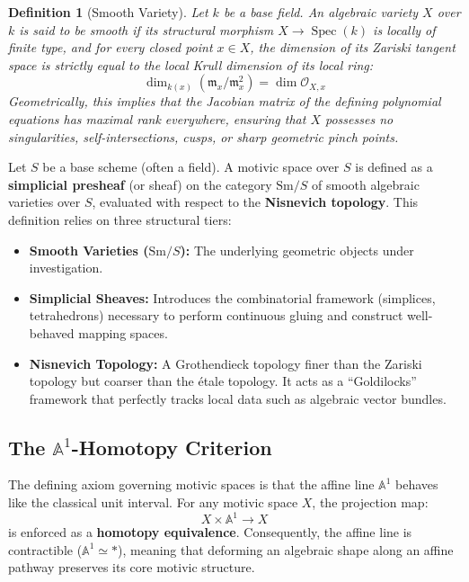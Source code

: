 \documentclass[11pt,oneside]{article}
\newtheorem{definition}{Definition}[section]
\DeclareMathOperator{\Spec}{Spec}
\begin{document}
\begin{definition}[Smooth Variety]
Let $k$ be a base field. An algebraic variety $X$ over $k$ is said to be \emph{smooth} if its structural morphism $X \to \Spec(k)$ is locally of finite type, and for every closed point $x \in X$, the dimension of its Zariski tangent space is strictly equal to the local Krull dimension of its local ring:
\[ \dim_{k(x)} (\mathfrak{m}_x / \mathfrak{m}_x^2) = \dim \mathcal{O}_{X,x} \]
Geometrically, this implies that the Jacobian matrix of the defining polynomial equations has maximal rank everywhere, ensuring that $X$ possesses no singularities, self-intersections, cusps, or sharp geometric pinch points.
\end{definition}

Let $S$ be a base scheme (often a field). A motivic space over $S$ is defined as a \textbf{simplicial presheaf} (or sheaf) on the category $\text{Sm}/S$ of smooth algebraic varieties over $S$, evaluated with respect to the \textbf{Nisnevich topology}. This definition relies on three structural tiers:
\begin{itemize}
    \item \textbf{Smooth Varieties ($\text{Sm}/S$):} The underlying geometric objects under investigation.
    \item \textbf{Simplicial Sheaves:} Introduces the combinatorial framework (simplices, tetrahedrons) necessary to perform continuous gluing and construct well-behaved mapping spaces.
    \item \textbf{Nisnevich Topology:} A Grothendieck topology finer than the Zariski topology but coarser than the \'etale topology. It acts as a ``Goldilocks'' framework that perfectly tracks local data such as algebraic vector bundles.
\end{itemize}

\subsection{The $\mathbb{A}^1$-Homotopy Criterion}

The defining axiom governing motivic spaces is that the affine line $\mathbb{A}^1$ behaves like the classical unit interval. For any motivic space $X$, the projection map:
\[ X \times \mathbb{A}^1 \longrightarrow X \]
is enforced as a \textbf{homotopy equivalence}. Consequently, the affine line is contractible ($\mathbb{A}^1 \simeq *$), meaning that deforming an algebraic shape along an affine pathway preserves its core motivic structure.
\end{document}
